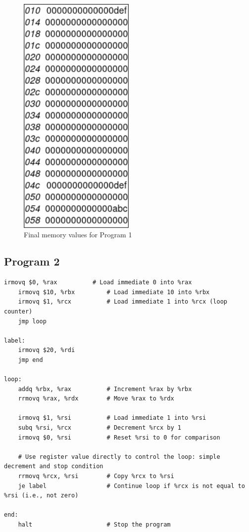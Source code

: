 \documentclass{article}
\begin{document}
\begin{figure}
    \centering
    \includegraphics[width=0.5\textwidth]{./images/test1_mem.png}
    \caption{Final memory values for Program 1}
\end{figure}

\subsection{Program 2}

\begin{lstlisting}[language=myassembly]
    irmovq $0, %rax          # Load immediate 0 into %rax
    irmovq $10, %rbx         # Load immediate 10 into %rbx
    irmovq $1, %rcx          # Load immediate 1 into %rcx (loop counter)
    jmp loop

label:
    irmovq $20, %rdi
    jmp end

loop:
    addq %rbx, %rax          # Increment %rax by %rbx
    rrmovq %rax, %rdx        # Move %rax to %rdx

    irmovq $1, %rsi          # Load immediate 1 into %rsi
    subq %rsi, %rcx          # Decrement %rcx by 1
    irmovq $0, %rsi          # Reset %rsi to 0 for comparison

    # Use register value directly to control the loop: simple decrement and stop condition
    rrmovq %rcx, %rsi        # Copy %rcx to %rsi
    je label                 # Continue loop if %rcx is not equal to %rsi (i.e., not zero)

end:
    halt                     # Stop the program

\end{lstlisting}
\end{document}
